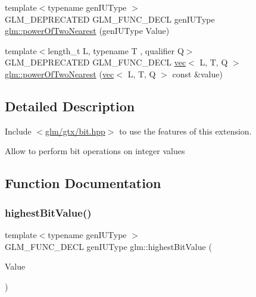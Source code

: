 \begin{DoxyCompactItemize}
\item 
{\footnotesize template$<$typename gen\+I\+U\+Type $>$ }\\G\+L\+M\+\_\+\+D\+E\+P\+R\+E\+C\+A\+T\+ED G\+L\+M\+\_\+\+F\+U\+N\+C\+\_\+\+D\+E\+CL gen\+I\+U\+Type \hyperlink{group__gtx__bit_ga5f65973a5d2ea38c719e6a663149ead9}{glm\+::power\+Of\+Two\+Nearest} (gen\+I\+U\+Type Value)
\item 
{\footnotesize template$<$length\+\_\+t L, typename T , qualifier Q$>$ }\\G\+L\+M\+\_\+\+D\+E\+P\+R\+E\+C\+A\+T\+ED G\+L\+M\+\_\+\+F\+U\+N\+C\+\_\+\+D\+E\+CL \hyperlink{structglm_1_1vec}{vec}$<$ L, T, Q $>$ \hyperlink{group__gtx__bit_gac87e65d11e16c3d6b91c3bcfaef7da0b}{glm\+::power\+Of\+Two\+Nearest} (\hyperlink{structglm_1_1vec}{vec}$<$ L, T, Q $>$ const \&value)
\end{DoxyCompactItemize}


\subsection{Detailed Description}
Include $<$\hyperlink{bit_8hpp}{glm/gtx/bit.\+hpp}$>$ to use the features of this extension.

Allow to perform bit operations on integer values 

\subsection{Function Documentation}
\mbox{\label{group__gtx__bit_ga0dcc8fe7c3d3ad60dea409281efa3d05}} 
\subsubsection{\texorpdfstring{highest\+Bit\+Value()}{highestBitValue()}\hspace{0.1cm}{\footnotesize\ttfamily [1/2]}}
{\footnotesize\ttfamily template$<$typename gen\+I\+U\+Type $>$ \\
G\+L\+M\+\_\+\+F\+U\+N\+C\+\_\+\+D\+E\+CL gen\+I\+U\+Type glm\+::highest\+Bit\+Value (\begin{DoxyParamCaption}\item[{gen\+I\+U\+Type}]{Value }\end{DoxyParamCaption})}



